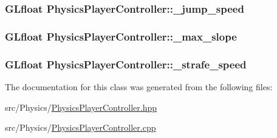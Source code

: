 \subsubsection[{\texorpdfstring{\+\_\+jump\+\_\+speed}{_jump_speed}}]{\setlength{\rightskip}{0pt plus 5cm}G\+Lfloat Physics\+Player\+Controller\+::\+\_\+jump\+\_\+speed\hspace{0.3cm}{\ttfamily [private]}}\hypertarget{classPhysicsPlayerController_a768842aa2f729fafe55ec1308708f006}{}\label{classPhysicsPlayerController_a768842aa2f729fafe55ec1308708f006}
\subsubsection[{\texorpdfstring{\+\_\+max\+\_\+slope}{_max_slope}}]{\setlength{\rightskip}{0pt plus 5cm}G\+Lfloat Physics\+Player\+Controller\+::\+\_\+max\+\_\+slope\hspace{0.3cm}{\ttfamily [private]}}\hypertarget{classPhysicsPlayerController_a29cffd08733c1fb185ed3fdbfaa9e045}{}\label{classPhysicsPlayerController_a29cffd08733c1fb185ed3fdbfaa9e045}
\subsubsection[{\texorpdfstring{\+\_\+strafe\+\_\+speed}{_strafe_speed}}]{\setlength{\rightskip}{0pt plus 5cm}G\+Lfloat Physics\+Player\+Controller\+::\+\_\+strafe\+\_\+speed\hspace{0.3cm}{\ttfamily [private]}}\hypertarget{classPhysicsPlayerController_a0650942e3b59e8598ab70d649d9823a9}{}\label{classPhysicsPlayerController_a0650942e3b59e8598ab70d649d9823a9}


The documentation for this class was generated from the following files\+:\begin{DoxyCompactItemize}
\item 
src/\+Physics/\hyperlink{PhysicsPlayerController_8hpp}{Physics\+Player\+Controller.\+hpp}\item 
src/\+Physics/\hyperlink{PhysicsPlayerController_8cpp}{Physics\+Player\+Controller.\+cpp}\end{DoxyCompactItemize}
